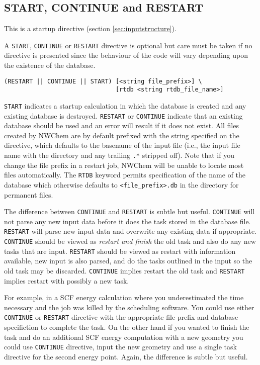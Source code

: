 
\subsection{START, CONTINUE and RESTART}
\label{sec:start}

This is a startup directive (section \ref{sec:inputstructure}).

A \verb+START+, \verb+CONTINUE+ or \verb+RESTART+ directive is
optional but care must be taken if no directive is presented since the
behaviour of the code will vary depending upon the existence of the
database.
\begin{verbatim}
(RESTART || CONTINUE || START) [<string file_prefix>] \
                               [rtdb <string rtdb_file_name>]
\end{verbatim}
\verb+START+ indicates a startup calculation in which the database is
created and any existing database is destroyed.  \verb+RESTART+ or
\verb+CONTINUE+ indicate that an existing database should be used and
an error will result if it does not exist.  All files created by
NWChem are by default prefixed with the string specified on the
directive, which defaults to the basename of the input file (i.e., the
input file name with the directory and any trailing \verb+.*+ stripped
off).  Note that if you change the file prefix in a restart job,
NWChem will be unable to locate most files automatically.  The
\verb+RTDB+ keyword permits specification of the name of the database
which otherwise defaults to \verb+<file_prefix>.db+ in the directory
for permanent files.

The difference between \verb+CONTINUE+ and \verb+RESTART+ is subtle
but useful. \verb+CONTINUE+ will not parse any new input data before
it does the task stored in the database file.  \verb+RESTART+ will
parse new input data and overwrite any existing data if appropriate.
\verb+CONTINUE+ should be viewed as {\it restart and finish} the
old task and also do any new tasks that are input. \verb+RESTART+
should be viewed as restart with information available, new input is
also parsed, and do the tasks outlined in the input so the old task
may be discarded.  \verb+CONTINUE+ implies restart the old task and
\verb+RESTART+ implies restart with possibly a new task.

For example, in a SCF energy calculation where you underestimated the
time necessary and the job was killed by the scheduling software.  You
could use either \verb+CONTINUE+ or \verb+RESTART+ directive with the
appropriate file prefix and database specifiction to complete the
task.  On the other hand if you wanted to finish the task and do an
additional SCF energy computation with a new geometry you could use
\verb+CONTINUE+ directive, input the new geometry and use a single
task directive for the second energy point.  Again, the difference is
subtle but useful.

